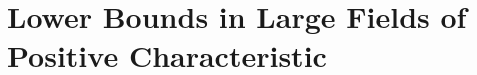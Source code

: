 \documentclass[11pt]{article}
\newtheorem{lemma}[theorem]{Lemma}
\newcommand{\Boo}{\{0,1 \}}
\newcommand{\F}{\mathbb{F}}
\newcommand{\IPSLINp}{\mathrm{IPS}_{\mathrm{LIN}'}}
\begin{document}
\section{Lower Bounds in Large Fields of Positive Characteristic}

\end{document}
